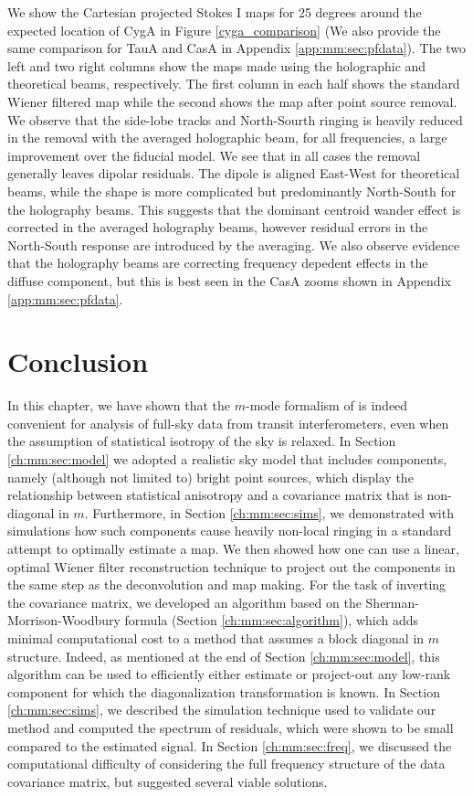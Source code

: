 We show the Cartesian projected Stokes I maps for 25 degrees around the expected location of CygA in Figure \ref{cyga_comparison} (We also provide the same comparison for TauA and CasA in Appendix \ref{app:mm:sec:pfdata}). The two left and two right columns show the maps made using the holographic and theoretical beams, respectively. The first column in each half shows the standard Wiener filtered map while the second shows the map after point source removal. We observe that the side-lobe tracks and North-Sourth ringing is heavily reduced in the removal with the averaged holographic beam, for all frequencies, a large improvement over the fiducial model. We see that in all cases the removal generally leaves dipolar residuals. The dipole is aligned East-West for theoretical beams, while the shape is more complicated but predominantly North-South for the holography beams. This suggests that the dominant centroid wander effect is corrected in the averaged holography beams, however residual errors in the North-South response are introduced by the averaging. We also observe evidence that the holography beams are correcting frequency depedent effects in the diffuse component, but this is best seen in the CasA zooms shown in Appendix \ref{app:mm:sec:pfdata}.

\section{Conclusion}
\label{ch:mm:sec:conclusions}

In this chapter, we have shown that the $m$-mode formalism of \cite{mmodes1, mmodes2} is indeed convenient for analysis of full-sky data from transit interferometers, even when the assumption of statistical isotropy of the sky is relaxed. In Section \ref{ch:mm:sec:model} we adopted a realistic sky model that includes components, namely (although not limited to) bright point sources, which display the relationship between statistical anisotropy and a covariance matrix that is non-diagonal in $m$. Furthermore, in Section \ref{ch:mm:sec:sims}, we demonstrated with simulations how such components cause heavily non-local ringing in a standard attempt to optimally estimate a map. We then showed how one can use a linear, optimal Wiener filter reconstruction technique to project out the components in the same step as the deconvolution and map making. For the task of inverting the covariance matrix, we developed an algorithm based on the Sherman-Morrison-Woodbury formula (Section \ref{ch:mm:sec:algorithm}), which adds minimal computational cost to a method that assumes a block diagonal in $m$ structure. Indeed, as mentioned at the end of Section \ref{ch:mm:sec:model}, this algorithm can be used to efficiently either estimate or project-out any low-rank component for which the diagonalization transformation is known. In Section \ref{ch:mm:sec:sims}, we described the simulation technique used to validate our method and computed the spectrum of residuals, which were shown to be small compared to the estimated signal. In Section \ref{ch:mm:sec:freq}, we discussed the computational difficulty of considering the full frequency structure of the data covariance matrix, but suggested several viable solutions.

